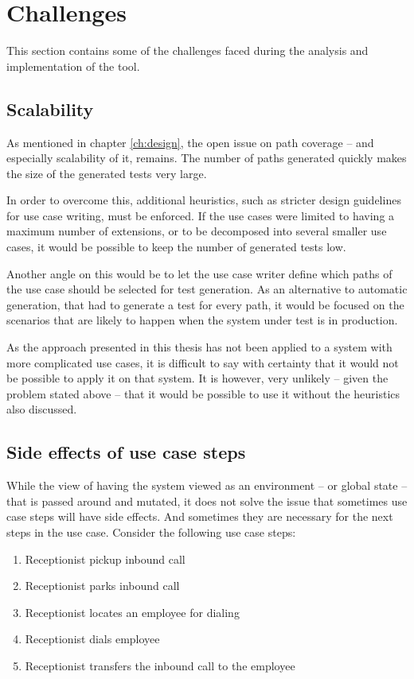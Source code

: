 \section{Challenges}
This section contains some of the challenges faced during the analysis and implementation of the tool.
\subsection{Scalability}
\label{sec:scalability}
As mentioned in chapter \ref{ch:design}, the open issue on path coverage -- and especially scalability of it, remains. The number of paths generated quickly makes the size of the generated tests very large.\medskip

\noindent In order to overcome this, additional heuristics, such as stricter design guidelines for use case writing, must be enforced. If the use cases were limited to having a maximum number of extensions, or to be decomposed into several smaller use cases, it would be possible to keep the number of generated tests low.\medskip

\noindent Another angle on this would be to let the use case writer define which paths of the use case should be selected for test generation. As an alternative to automatic generation, that had to generate a test for every path, it would be focused on the scenarios that are likely to happen when the system under test is in production.\medskip

\noindent As the approach presented in this thesis has not been applied to a system with more complicated use cases, it is difficult to say with certainty that it would not be possible to apply it on that system. It is however, very unlikely -- given the problem stated above -- that it would be possible to use it without the heuristics also discussed.

\subsection{Side effects of use case steps}
While the view of having the system viewed as an environment -- or global state -- that is passed around and mutated, it does not solve the issue that sometimes use case steps will have side effects. And sometimes they are necessary for the next steps in the use case. Consider the following use case steps:

\begin{enumerate}
 \item Receptionist pickup inbound call
 \item Receptionist parks inbound call
 \item Receptionist locates an employee for dialing
 \item Receptionist dials employee
 \item Receptionist transfers the inbound call to the employee
\end{enumerate}

